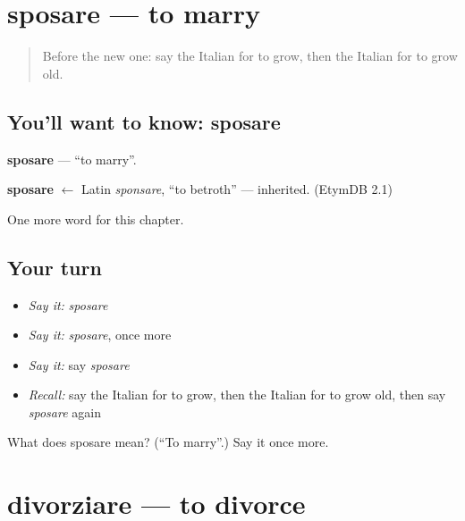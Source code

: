 \section[sposare]{sposare — to marry}

\label{lesson:IT-C207-sposare}



\begin{quote}
Before the new one: say the Italian for to grow, then the Italian for to grow old.
\end{quote}

\subsection*{You'll want to know: sposare}
\textbf{sposare} — \textquotedblleft{}to marry\textquotedblright{}.

\begin{cousinweb}
\textbf{sposare} $\leftarrow$ Latin \emph{sponsare}, \textquotedblleft{}to betroth\textquotedblright{} — inherited. (EtymDB 2.1)
\end{cousinweb}

\begin{grammarlens}[title={What you've built}]
One more word for this chapter.
\end{grammarlens}

\subsection*{Your turn}
\begin{itemize}
\raggedright
  \item \emph{Say it:} \emph{sposare}
  \item \emph{Say it:} \emph{sposare}, once more
  \item \emph{Say it:} say \emph{sposare}
  \item \emph{Recall:} say the Italian for to grow, then the Italian for to grow old, then say \emph{sposare} again
\end{itemize}

\begin{tcolorbox}[breakable,colback=teal!4,colframe=teal!35!black,title={Before you move on}]
What does sposare mean? (\textquotedblleft{}To marry\textquotedblright{}.) Say it once more.
\end{tcolorbox}
\section[divorziare]{divorziare — to divorce}

